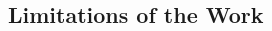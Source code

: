\documentclass[jpm,article,submit,moreauthors,pdftex]{Definitions/mdpi}
\begin{document}
\begin{paracol}{2}





\subsection{Limitations of the Work}


\end{paracol}
\end{document}
